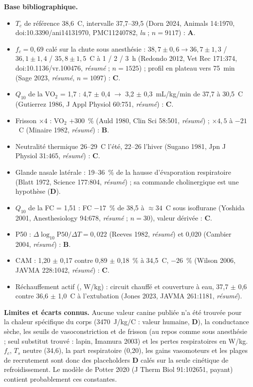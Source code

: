 \documentclass[10pt,a4paper]{article}
\newcommand{\vp}[1]{\text{\texttt{\detokenize{#1}}}}
\newcommand{\evA}{\textcolor{green!45!black}{\textbf{A}}}
\newcommand{\evB}{\textcolor{green!45!black}{\textbf{B}}}
\newcommand{\evC}{\textcolor{orange!80!black}{\textbf{C}}}
\newcommand{\evD}{\textcolor{red!70!black}{\textbf{D}}}
\newcommand{\acc}[1]{\textsl{#1}}
\newcommand{\limite}[1]{\par\textbf{Limites et écarts connus.} #1}
\newcommand{\sources}[1]{\par\textbf{Base bibliographique.} #1}
\begin{document}
\sources{
\begin{itemize}
\item $T_c$ de référence 38,6~\degre C, intervalle 37,7--39,5 (Dorn 2024, Animals 14:1970, doi:10.3390/ani14131970, PMC11240782, \acc{lu} ; $n = 9117$) : \evA{}.
\item $f_c = 0{,}69$ calé sur la chute sous anesthésie : $38{,}7 \pm 0{,}6 \to 36{,}7 \pm 1{,}3$ / $36{,}1 \pm 1{,}4$ / $35{,}8 \pm 1{,}5$~\degre C à 1 / 2 / 3~h (Redondo 2012, Vet Rec 171:374, doi:10.1136/vr.100476, \acc{résumé} ; $n = 1525$) ; profil en plateau vers 75~min (Sage 2023, \acc{résumé}, $n = 1097$) : \evC{}.
\item $Q_{10}$ de la VO$_2$ = 1,7 : 4,7 $\pm$ 0,4 $\to$ 3,2 $\pm$ 0,3~mL/kg/min de 37,7 à 30,5~\degre C (Gutierrez 1986, J Appl Physiol 60:751, \acc{résumé}) : \evC{}.
\item Frisson $\times 4$ : VO$_2$ $+300$~\% (Auld 1980, Clin Sci 58:501, \acc{résumé}) ; $\times 4{,}5$ à $-21$~\degre C (Minaire 1982, \acc{résumé}) : \evB{}.
\item Neutralité thermique 26--29~\degre C l'été, 22--26 l'hiver (Sugano 1981, Jpn J Physiol 31:465, \acc{résumé}) : \evC{}.
\item Glande nasale latérale : 19--36~\% de la hausse d'évaporation respiratoire (Blatt 1972, Science 177:804, \acc{résumé}) ; sa commande cholinergique est une hypothèse (\evD{}).
\item $Q_{10}$ de la FC = 1,51 : FC $-17$~\% de 38,5 à $\approx 34$~\degre C sous isoflurane (Yoshida 2001, Anesthesiology 94:678, \acc{résumé} ; $n = 30$), valeur dérivée : \evC{}.
\item P50 : $\Delta\log_{10}\text{P50}/\Delta T = 0{,}022$ (Reeves 1982, \acc{résumé}) et 0,020 (Cambier 2004, \acc{résumé}) : \evB{}.
\item CAM : 1,20 $\pm$ 0,17 contre 0,89 $\pm$ 0,18~\% à 34,5~\degre C, $-26$~\% (Wilson 2006, JAVMA 228:1042, \acc{résumé}) : \evC{}.
\item Réchauffement actif (\vp{warming}, W/kg) : circuit chauffé et couverture à eau, 37,7 $\pm$ 0,6 contre 36,6 $\pm$ 1,0~\degre C à l'extubation (Jones 2023, JAVMA 261:1181, \acc{résumé}).
\end{itemize}}
\limite{Aucune valeur canine publiée n'a été trouvée pour la chaleur spécifique du corps
(3470~J/kg/\degre C : valeur humaine, \evD{}), la conductance sèche, les seuils de
vasoconstriction et de frisson (au repos comme sous anesthésie ; seul substitut trouvé : lapin,
Imamura 2003) et les pertes respiratoires en W/kg. $f_c$, $T_s$ neutre (34,6), la part
respiratoire (0,20), les gains vasomoteurs et les plages de recrutement sont donc des
placeholders \evD{} calés sur la seule cinétique de refroidissement. Le modèle de Potter 2020
(J Therm Biol 91:102651, payant) contient probablement ces constantes.}
\end{document}
